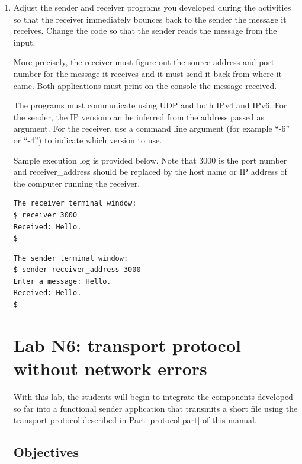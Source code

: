 \documentclass[12pt]{book}
\begin{document}
\begin{enumerate}[label=\arabic*.]
\item Adjust the sender and receiver programs you developed during the activities so that the receiver immediately bounces back to the sender the message it receives. Change the code so that the sender reads the message from the input.

  More precisely, the receiver must figure out the source address and port number for the message it receives and it must send it back from where it came. Both applications must print on the console the message received.

  The programs must communicate using UDP and both IPv4 and IPv6. For the sender, the IP version can be inferred from the address passed as argument. For the receiver, use a command line argument (for example ``-6'' or ``-4'') to indicate which version to use.

  Sample execution log is provided below. Note that 3000 is the port number and receiver\_address should be replaced by the host name or IP address of the computer running the receiver.

\begin{verbatim}
The receiver terminal window:
$ receiver 3000
Received: Hello.
$
\end{verbatim}

\begin{verbatim}
The sender terminal window:
$ sender receiver_address 3000
Enter a message: Hello.
Received: Hello.
$
\end{verbatim}



\chapter{Lab N6: transport protocol without network errors}

With this lab, the students will begin to integrate the components developed so far into a functional sender application that transmits a short file using the transport protocol described in Part \ref{protocol.part} of this manual. 

\section{Objectives}


\end{enumerate}
\end{document}
